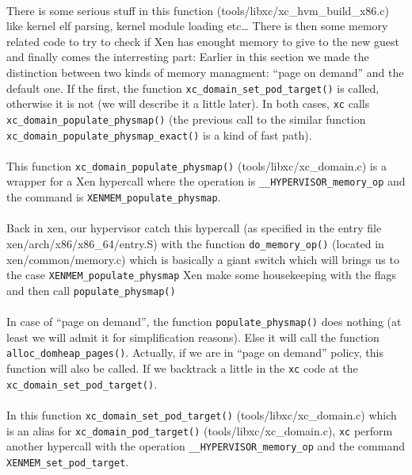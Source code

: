 \paragraph{}
There is some serious stuff in this function
(tools/libxc/xc\_hvm\_build\_x86.c) like kernel elf parsing, kernel module
loading etc\ldots
There is then some memory related code to try to check if Xen has enought
memory to give to the new guest and finally comes the interresting part:
Earlier in this section we made the distinction between two kinds of memory
managment: ``page on demand'' and the default one.
If the first, the function \verb!xc_domain_set_pod_target()! is called,
otherwise it is not (we will describe it a little later).
In both cases, \verb!xc! calls \verb!xc_domain_populate_physmap()!
(the previous call to the similar function
\verb!xc_domain_populate_physmap_exact()! is a kind of fast path).

\paragraph{}
This function \verb!xc_domain_populate_physmap()! (tools/libxc/xc\_domain.c) is
a wrapper for a Xen hypercall where the operation is
\verb!__HYPERVISOR_memory_op! and the command is
\verb!XENMEM_populate_physmap!.

\paragraph{}
Back in xen, our hypervisor catch this hypercall (as specified in the entry
file xen/arch/x86/x86\_64/entry.S) with the function \verb!do_memory_op()!
(located in xen/common/memory.c) which is basically a giant switch which will
brings us to the case \verb!XENMEM_populate_physmap! Xen make some
housekeeping with the flags and then call \verb!populate_physmap()!

\paragraph{}
In case of ``page on demand'', the function \verb!populate_physmap()! does
nothing (at least we will admit it for simplification reasons).
Else it will call the function \verb!alloc_domheap_pages()!.
Actually, if we are in ``page on demand'' policy, this function will also be
called.
If we backtrack a little in the \verb!xc! code at the
\verb!xc_domain_set_pod_target()!.

\paragraph{}
In this function \verb!xc_domain_set_pod_target()! (tools/libxc/xc\_domain.c)
which is an alias for \verb!xc_domain_pod_target()! (tools/libxc/xc\_domain.c),
\verb!xc! perform another hypercall with the operation
\verb!__HYPERVISOR_memory_op! and the command \verb!XENMEM_set_pod_target!.

